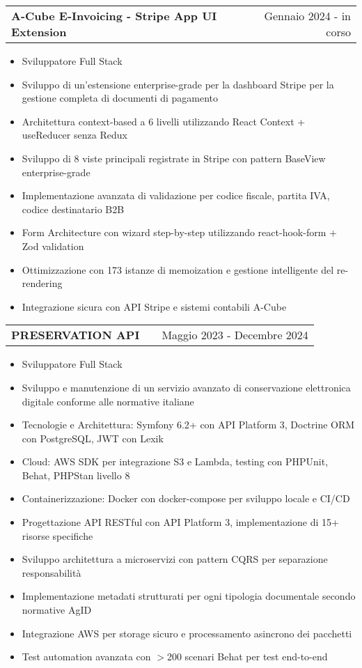 \documentclass[a4paper,12pt]{article}
\makeatletter
\newenvironment{joblong}[2]
    {
    \begin{tabularx}{\linewidth}{@{}l X r@{}}
    \textbf{#1} & \hfill &  #2 \\[3.75pt]
    \end{tabularx}
    \begin{minipage}[t]{\linewidth}
    \begin{itemize}[nosep,after=\strut, leftmargin=1em, itemsep=3pt,label=--]
    }
    {
    \end{itemize}
    \end{minipage}    
    }
\makeatother
\begin{document}
\begin{joblong}{A-Cube E-Invoicing - Stripe App UI Extension}{Gennaio 2024 -  in corso}
\item Sviluppatore Full Stack
\item Sviluppo di un'estensione enterprise-grade per la dashboard Stripe per la gestione completa di documenti di pagamento
\item Architettura context-based a 6 livelli utilizzando React Context + useReducer senza Redux
\item Sviluppo di 8 viste principali registrate in Stripe con pattern BaseView enterprise-grade
\item Implementazione avanzata di validazione per codice fiscale, partita IVA, codice destinatario B2B
\item Form Architecture con wizard step-by-step utilizzando react-hook-form + Zod validation
\item Ottimizzazione con 173 istanze di memoization e gestione intelligente del re-rendering
\item Integrazione sicura con API Stripe e sistemi contabili A-Cube
\end{joblong}

\begin{joblong}{PRESERVATION API}{Maggio 2023 -  Decembre 2024}
\item Sviluppatore Full Stack
\item Sviluppo e manutenzione di un servizio avanzato di conservazione elettronica digitale conforme alle normative italiane
\item Tecnologie e Architettura: Symfony 6.2+ con API Platform 3, Doctrine ORM con PostgreSQL, JWT con Lexik
\item Cloud: AWS SDK per integrazione S3 e Lambda, testing con PHPUnit, Behat, PHPStan livello 8
\item Containerizzazione: Docker con docker-compose per sviluppo locale e CI/CD
\item Progettazione API RESTful con API Platform 3, implementazione di 15+ risorse specifiche
\item Sviluppo architettura a microservizi con pattern CQRS per separazione responsabilità
\item Implementazione metadati strutturati per ogni tipologia documentale secondo normative AgID
\item Integrazione AWS per storage sicuro e processamento asincrono dei pacchetti
\item Test automation avanzata con $>$200 scenari Behat per test end-to-end
\end{joblong}
\end{document}
